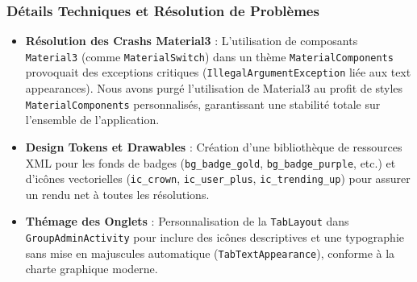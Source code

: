 \documentclass{article}
\begin{document}
\subsubsection{Détails Techniques et Résolution de Problèmes}
\begin{itemize}
    \item \textbf{Résolution des Crashs Material3} : L'utilisation de composants \texttt{Material3} (comme \texttt{MaterialSwitch}) dans un thème \texttt{MaterialComponents} provoquait des exceptions critiques (\texttt{IllegalArgumentException} liée aux text appearances). Nous avons purgé l'utilisation de Material3 au profit de styles \texttt{MaterialComponents} personnalisés, garantissant une stabilité totale sur l'ensemble de l'application.
    \item \textbf{Design Tokens et Drawables} : Création d'une bibliothèque de ressources XML pour les fonds de badges (\texttt{bg\_badge\_gold}, \texttt{bg\_badge\_purple}, etc.) et d'icônes vectorielles (\texttt{ic\_crown}, \texttt{ic\_user\_plus}, \texttt{ic\_trending\_up}) pour assurer un rendu net à toutes les résolutions.
    \item \textbf{Thémage des Onglets} : Personnalisation de la \texttt{TabLayout} dans \texttt{GroupAdminActivity} pour inclure des icônes descriptives et une typographie sans mise en majuscules automatique (\texttt{TabTextAppearance}), conforme à la charte graphique moderne.
\end{itemize}
\end{document}
